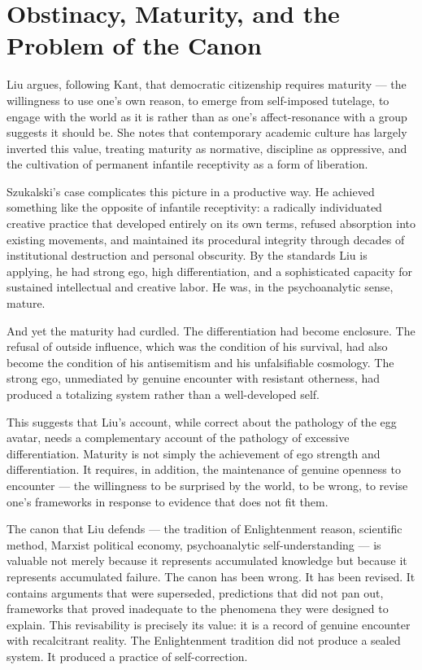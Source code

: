 \documentclass[11pt, a4paper]{article}
\theoremstyle{named}
\begin{document}
\section{Obstinacy, Maturity, and the Problem of the Canon}

Liu argues, following Kant, that democratic citizenship requires
maturity — the willingness to use one's own reason, to emerge from
self-imposed tutelage, to engage with the world as it is rather than
as one's affect-resonance with a group suggests it should be. She
notes that contemporary academic culture has largely inverted this
value, treating maturity as normative, discipline as oppressive, and
the cultivation of permanent infantile receptivity as a form of
liberation.

Szukalski's case complicates this picture in a productive way. He
achieved something like the opposite of infantile receptivity: a
radically individuated creative practice that developed entirely on
its own terms, refused absorption into existing movements, and
maintained its procedural integrity through decades of institutional
destruction and personal obscurity. By the standards Liu is applying,
he had strong ego, high differentiation, and a sophisticated capacity
for sustained intellectual and creative labor. He was, in the
psychoanalytic sense, mature.

And yet the maturity had curdled. The differentiation had become
enclosure. The refusal of outside influence, which was the condition
of his survival, had also become the condition of his antisemitism
and his unfalsifiable cosmology. The strong ego, unmediated by genuine
encounter with resistant otherness, had produced a totalizing system
rather than a well-developed self.

This suggests that Liu's account, while correct about the pathology
of the egg avatar, needs a complementary account of the pathology
of excessive differentiation. Maturity is not simply the achievement
of ego strength and differentiation. It requires, in addition, the
maintenance of genuine openness to encounter — the willingness to
be surprised by the world, to be wrong, to revise one's frameworks
in response to evidence that does not fit them.

The canon that Liu defends — the tradition of Enlightenment reason,
scientific method, Marxist political economy, psychoanalytic
self-understanding — is valuable not merely because it represents
accumulated knowledge but because it represents accumulated failure.
The canon has been wrong. It has been revised. It contains arguments
that were superseded, predictions that did not pan out, frameworks
that proved inadequate to the phenomena they were designed to explain.
This revisability is precisely its value: it is a record of genuine
encounter with recalcitrant reality. The Enlightenment tradition did
not produce a sealed system. It produced a practice of self-correction.
\end{document}
